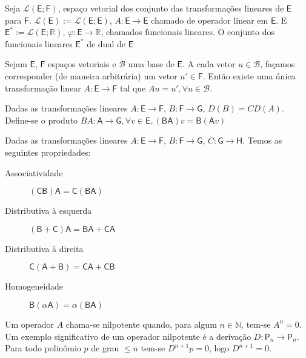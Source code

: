 \documentclass[10pt,a4paper]{article}
\begin{document}
\begin{definition}
	Seja $\mathcal{L}(\textsf{E}; \textsf{F})$, espaço vetorial dos conjunto das transformações lineares de $\textsf{E}$ para $\textsf{F}$. $\mathcal{L}(\textsf{E}) := \mathcal{L}(\textsf{E}; \textsf{E})$, $A: \textsf{E} \rightarrow \textsf{E}$ chamado de operador linear em $\textsf{E}$. E $\textsf{E}^* :=\mathcal{L}(\textsf{E}; \mathbb{R})$, $\varphi:\textsf{E} \rightarrow \mathbb{R}$, chamados funcionais lineares. O conjunto dos funcionais lineares $\textsf{E}^*$ de dual de $\textsf{E}$
\end{definition}

\begin{theorem}
	Sejam $\textsf{E}$, $\textsf{F}$ espaços vetoriais e $\mathcal{B}$ uma base de $\textsf{E}$. A cada vetor $u \in \mathcal{B}$, façamos corresponder (de maneira arbitrária) um vetor $u' \in \textsf{F}$. Então existe uma única transformação linear $A:\textsf{E} \rightarrow \textsf{F}$ tal que $Au = u', \forall u \in \mathcal{B}$.
\end{theorem}

\begin{definition}
	Dadas as transformações lineares $A:\textsf{E} \rightarrow \textsf{F}$, $B:\textsf{F} \rightarrow \textsf{G}$, $D(B) = CD(A)$. Define-se o produto $BA:\textsf{A} \rightarrow \textsf{G}, \forall v \in \textsf{E}, (\textsf{BA})v = \textsf{B}(\textsf{A}v)$
\end{definition}


Dadas as transformações lineares $A:\textsf{E} \rightarrow \textsf{F}$, $B:\textsf{F} \rightarrow \textsf{G}$, $C:\textsf{G} \rightarrow \textsf{H}$. Temos as seguintes propriedades:
\begin{description}
	\item[Associatividade] $(\textsf{C}\textsf{B})\textsf{A} = \textsf{C}(\textsf{B}\textsf{A})$
	\item[Distributiva à esquerda] $(\textsf{B} + \textsf{C})\textsf{A} = \textsf{B}\textsf{A} + \textsf{C}\textsf{A}$
	\item[Distributiva à direita] $\textsf{C}(\textsf{A} + \textsf{B}) = \textsf{C}\textsf{A} + \textsf{C}\textsf{B}$
	\item[Homogeneidade] $\textsf{B}(\alpha\textsf{A}) = \alpha(\textsf{B}\textsf{A})$
\end{description}

\begin{definition}
	Um operador $A$ chama-se nilpotente quando, para algum $n \in \mathbb{N}$, tem-se $A^n = 0$. Um exemplo significativo de um operador nilpotente é a derivação $D: \textsf{P}_n \rightarrow \textsf{P}_n$. Para todo polinômio $p$ de grau $\leq n$ tem-se $D^{n + 1}p = 0$, logo $D^{n + 1} = 0$.
\end{definition}
\end{document}

